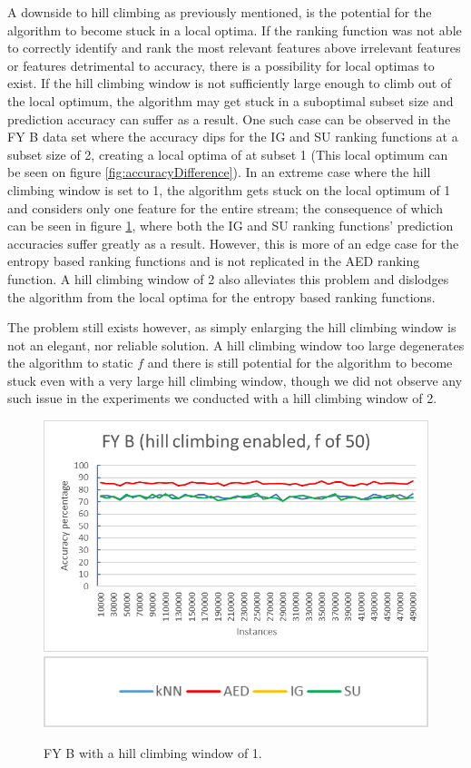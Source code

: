 A downside to hill climbing as previously mentioned, is the potential for the algorithm to become stuck in a local optima. If the ranking function was not able to correctly identify and rank the most relevant features above irrelevant features or features detrimental to accuracy, there is a possibility for local optimas to exist. If the hill climbing window is not sufficiently large enough to climb out of the local optimum, the algorithm may get stuck in a suboptimal subset size and prediction accuracy can suffer as a result. One such case can be observed in the FY B data set where the accuracy dips for the IG and SU ranking functions at a subset size of 2, creating a local optima of at subset 1 (This local optimum can be seen on figure \ref{fig:accuracyDifference}). In an extreme case where the hill climbing window is set to 1, the algorithm gets stuck on the local optimum of 1 and considers only one feature for the entire stream; the consequence of which can be seen in figure \ref{fig:stuck_graph}, where both the IG and SU ranking functions' prediction accuracies suffer greatly as a result. However, this is more of an edge case for the entropy based ranking functions and is not replicated in the AED ranking function. A hill climbing window of 2 also alleviates this problem and dislodges the algorithm from the local optima for the entropy based ranking functions. 

The problem still exists however, as simply enlarging the hill climbing window is not an elegant, nor reliable solution. A hill climbing window too large degenerates the algorithm to static $f$ and there is still potential for the algorithm to become stuck even with a very large hill climbing window, though we did not observe any such issue in the experiments we conducted with a hill climbing window of 2.

\begin{figure}[h]
\centering 
\includegraphics[scale=0.25]{Graphs/FY_B/H_graph_stuck}
\includegraphics[scale=0.5]{Graphs/legend}
\caption{FY B with a hill climbing window of 1.}
\label{fig:stuck_graph}
\end{figure}

